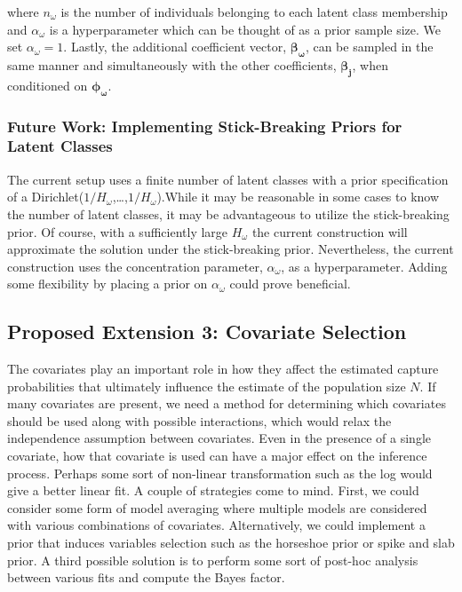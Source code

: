 \documentclass[
  12pt,
]{article}
\begin{document}
where \(n_{\omega}\) is the number of individuals belonging to each
latent class membership and \(\alpha_\omega\) is a hyperparameter which
can be thought of as a prior sample size. We set \(\alpha_\omega=1\).
Lastly, the additional coefficient vector,
\(\boldsymbol{\beta_\omega}\), can be sampled in the same manner and
simultaneously with the other coefficients, \(\boldsymbol{\beta_j}\),
when conditioned on \(\boldsymbol{\phi_\omega}\).

\subsubsection{Future Work: Implementing Stick-Breaking Priors for Latent Classes}

The current setup uses a finite number of latent classes with a prior
specification of a Dirichlet(\(1/H_\omega\),\ldots,\(1/H_\omega\)).While
it may be reasonable in some cases to know the number of latent classes,
it may be advantageous to utilize the stick-breaking prior. Of course,
with a sufficiently large \(H_\omega\) the current construction will
approximate the solution under the stick-breaking prior. Nevertheless,
the current construction uses the concentration parameter,
\(\alpha_\omega\), as a hyperparameter. Adding some flexibility by
placing a prior on \(\alpha_\omega\) could prove beneficial.

\subsection{Proposed Extension 3: Covariate Selection}
\label{Sec:variableselection}

The covariates play an important role in how they affect the estimated
capture probabilities that ultimately influence the estimate of the
population size \(N\). If many covariates are present, we need a method
for determining which covariates should be used along with possible
interactions, which would relax the independence assumption between
covariates. Even in the presence of a single covariate, how that
covariate is used can have a major effect on the inference process.
Perhaps some sort of non-linear transformation such as the log would
give a better linear fit. A couple of strategies come to mind. First, we
could consider some form of model averaging where multiple models are
considered with various combinations of covariates. Alternatively, we
could implement a prior that induces variables selection such as the
horseshoe prior or spike and slab prior. A third possible solution is to
perform some sort of post-hoc analysis between various fits and compute
the Bayes factor.
\end{document}
